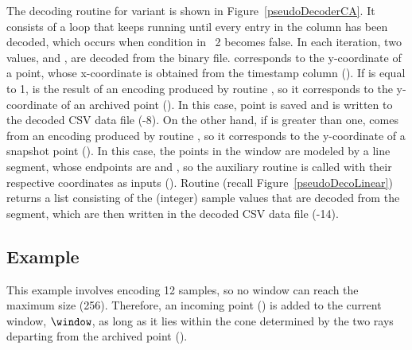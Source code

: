 \vspace{-8pt}


\vspace{-5pt}
The decoding routine for variant \maskalgo is shown in Figure~\ref{pseudoDecoderCA}. It consists of a loop that keeps running until every entry in the column has been decoded, which occurs when condition in \Line~2 becomes false. In each iteration, two values, \sizee and , are decoded from the binary file.  corresponds to the y-coordinate of a point, whose x-coordinate is obtained from the timestamp column (). If \sizee is equal to 1,  is the result of an encoding produced by routine \CAWinStart, so it corresponds to the y-coordinate of an archived point (\archived). In this case, point \archived is saved and  is written to the decoded CSV data file (-8). On the other hand, if \sizee is greater than one,  comes from an encoding produced by routine \CAWinEnd, so it corresponds to the y-coordinate of a snapshot point (\snapshot). In this case, the points in the window are modeled by a line segment, whose endpoints are \archived and \snapshot, so the auxiliary routine \decodeSegment is called with their respective coordinates as inputs (). Routine \decodeSegment (recall Figure~\ref{pseudoDecoLinear}) returns a list consisting of the (integer) sample values that are decoded from the segment, which are then written in the decoded CSV data file (-14).







\clearpage
\subsection{Example}
\label{algo:ca:example}


\exampleIntro{\ref{example:ca:1}}


This example involves encoding 12 samples, so no window can reach the maximum size (256). Therefore, an incoming point (\incoming) is added to the current window, $\window$, as long as it lies within the cone determined by the two rays departing from the archived point (\archived).


